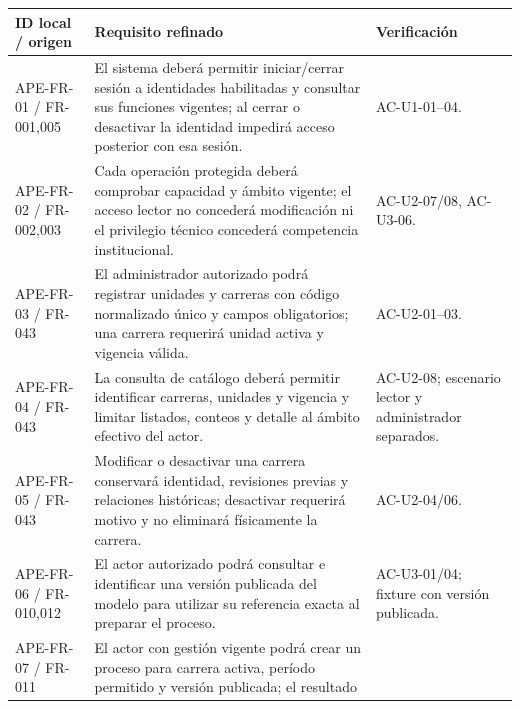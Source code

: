 \documentclass[11pt,a4paper]{article}
\begin{document}
{\def\LTcaptype{none} %
\begin{longtable}[]{@{}
  >{\raggedright\arraybackslash}p{}
  >{\raggedright\arraybackslash}p{}
  >{\raggedright\arraybackslash}p{}@{}}
\toprule\noalign{}
\begin{minipage}[b]{\linewidth}\raggedright
ID local / origen
\end{minipage} & \begin{minipage}[b]{\linewidth}\raggedright
Requisito refinado
\end{minipage} & \begin{minipage}[b]{\linewidth}\raggedright
Verificación
\end{minipage} \\
\midrule\noalign{}
\endhead
\bottomrule\noalign{}
\endlastfoot
APE-FR-01 / FR-001,005 & El sistema deberá permitir iniciar/cerrar
sesión a identidades habilitadas y consultar sus funciones vigentes; al
cerrar o desactivar la identidad impedirá acceso posterior con esa
sesión. & AC-U1-01--04. \\
APE-FR-02 / FR-002,003 & Cada operación protegida deberá comprobar
capacidad y ámbito vigente; el acceso lector no concederá modificación
ni el privilegio técnico concederá competencia institucional. &
AC-U2-07/08, AC-U3-06. \\
APE-FR-03 / FR-043 & El administrador autorizado podrá registrar
unidades y carreras con código normalizado único y campos obligatorios;
una carrera requerirá unidad activa y vigencia válida. &
AC-U2-01--03. \\
APE-FR-04 / FR-043 & La consulta de catálogo deberá permitir identificar
carreras, unidades y vigencia y limitar listados, conteos y detalle al
ámbito efectivo del actor. & AC-U2-08; escenario lector y administrador
separados. \\
APE-FR-05 / FR-043 & Modificar o desactivar una carrera conservará
identidad, revisiones previas y relaciones históricas; desactivar
requerirá motivo y no eliminará físicamente la carrera. &
AC-U2-04/06. \\
APE-FR-06 / FR-010,012 & El actor autorizado podrá consultar e
identificar una versión publicada del modelo para utilizar su referencia
exacta al preparar el proceso. & AC-U3-01/04; fixture con versión
publicada. \\
APE-FR-07 / FR-011 & El actor con gestión vigente podrá crear un proceso
para carrera activa, período permitido y versión publicada; el resultado

\end{longtable}}
\end{document}
